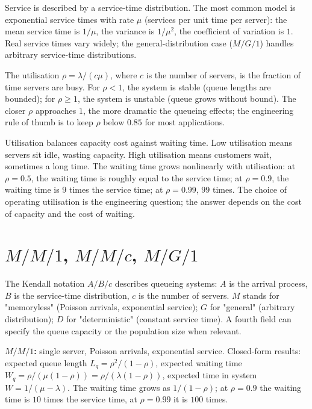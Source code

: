 Service is described by a service-time distribution. The most common model is exponential service times with rate $\mu$ (services per unit time per server): the mean service time is $1/\mu$, the variance is $1/\mu^2$, the coefficient of variation is $1$. Real service times vary widely; the general-distribution case ($M/G/1$) handles arbitrary service-time distributions.

The utilisation $\rho = \lambda/(c\mu)$, where $c$ is the number of servers, is the fraction of time servers are busy. For $\rho < 1$, the system is stable (queue lengths are bounded); for $\rho \geq 1$, the system is unstable (queue grows without bound). The closer $\rho$ approaches $1$, the more dramatic the queueing effects; the engineering rule of thumb is to keep $\rho$ below $0.85$ for most applications.

\begin{archetype}
Utilisation balances capacity cost against waiting time. Low utilisation means servers sit idle, wasting capacity. High utilisation means customers wait, sometimes a long time. The waiting time grows nonlinearly with utilisation: at $\rho = 0.5$, the waiting time is roughly equal to the service time; at $\rho = 0.9$, the waiting time is $9$ times the service time; at $\rho = 0.99$, $99$ times. The choice of operating utilisation is the engineering question; the answer depends on the cost of capacity and the cost of waiting.
\end{archetype}

\section{$M/M/1$, $M/M/c$, $M/G/1$}

The Kendall notation $A/B/c$ describes queueing systems: $A$ is the arrival process, $B$ is the service-time distribution, $c$ is the number of servers. $M$ stands for "memoryless" (Poisson arrivals, exponential service); $G$ for "general" (arbitrary distribution); $D$ for "deterministic" (constant service time). A fourth field can specify the queue capacity or the population size when relevant.

\textbf{$M/M/1$:} single server, Poisson arrivals, exponential service. Closed-form results: expected queue length $L_q = \rho^2/(1-\rho)$, expected waiting time $W_q = \rho/(\mu(1-\rho)) = \rho/(\lambda(1-\rho))$, expected time in system $W = 1/(\mu - \lambda)$. The waiting time grows as $1/(1-\rho)$; at $\rho = 0.9$ the waiting time is $10$ times the service time, at $\rho = 0.99$ it is $100$ times.

